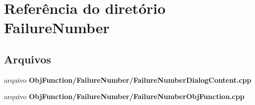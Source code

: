 \section{Referência do diretório Failure\+Number}
\label{dir_cd0af1452a59269ff06bc4e3ede615da}
\subsection*{Arquivos}
\begin{DoxyCompactItemize}
\item 
arquivo {\bf Obj\+Function/\+Failure\+Number/\+Failure\+Number\+Dialog\+Content.\+cpp}
\item 
arquivo {\bf Obj\+Function/\+Failure\+Number/\+Failure\+Number\+Obj\+Function.\+cpp}
\end{DoxyCompactItemize}
